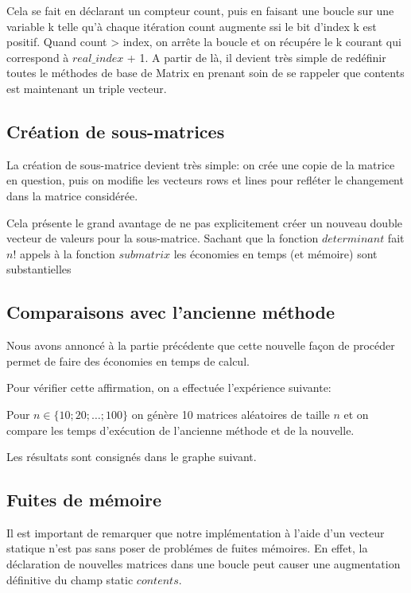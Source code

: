 \documentclass[a4paper,11pt]{article}
\begin{document}
Cela se fait en déclarant un compteur count, puis en faisant une boucle sur une variable k telle qu'à chaque itération count augmente ssi le bit d'index k est positif. Quand count > index, on arrête la boucle
et on récupére le k courant qui correspond à $real\_index$ + 1. 
A partir de là, il devient très simple de redéfinir toutes le méthodes de base de Matrix en prenant soin de se rappeler que contents est maintenant un triple vecteur.

\subsection{Création de sous-matrices}

La création de sous-matrice devient très simple: on crée une copie de la matrice en question, puis on modifie les vecteurs rows et lines pour refléter le changement dans la matrice considérée.

Cela présente le grand avantage de ne pas explicitement créer un nouveau double vecteur de valeurs pour la sous-matrice. Sachant que la fonction $determinant$ fait $n$! appels à la fonction $submatrix$ les économies en temps (et mémoire) sont substantielles


\subsection{Comparaisons avec l'ancienne méthode}

Nous avons annoncé à la partie précédente que cette nouvelle façon de procéder permet de faire des économies en temps de calcul.

Pour vérifier cette affirmation, on a effectuée l'expérience suivante:

Pour $n \in \{10;20;\dots;100\}$ on génère 10 matrices aléatoires de taille $n$ et on compare les temps d'exécution de l'ancienne méthode et de la nouvelle.

Les résultats sont consignés dans le graphe suivant.

\subsection{Fuites de mémoire}

Il est important de remarquer que notre implémentation à l'aide d'un vecteur statique n'est pas sans poser de problémes de fuites mémoires.
En effet, la déclaration de nouvelles matrices dans une boucle peut causer une augmentation définitive du champ static $contents$.
\end{document}
